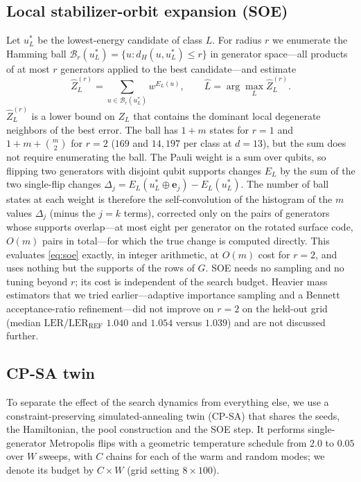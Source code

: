 \documentclass[journal]{IEEEtran}
\newcommand{\REF}{\mathrm{REF}}
\newcommand{\LER}{\mathrm{LER}}
\begin{document}
\subsection{Local stabilizer-orbit expansion (SOE)}
\label{sec:soe}
Let $u_L^\ast$ be the lowest-energy candidate of class $L$. For radius $r$ we enumerate the Hamming ball $\mathcal{B}_r(u_L^\ast)=\{u: d_H(u,u_L^\ast)\le r\}$ in generator space---all products of at most $r$ generators applied to the best candidate---and estimate
\begin{equation}
\hat Z_L^{(r)}=\sum_{u\in\mathcal{B}_r(u_L^\ast)} w^{E_L(u)},\qquad \hat L=\arg\max_L \hat Z_L^{(r)}.
\label{eq:soe}
\end{equation}
$\hat Z_L^{(r)}$ is a lower bound on $Z_L$ that contains the dominant local degenerate neighbors of the best error. The ball has $1+m$ states for $r=1$ and $1+m+\binom{m}{2}$ for $r=2$ ($169$ and $14{,}197$ per class at $d=13$), but the sum does not require enumerating the ball. The Pauli weight is a sum over qubits, so flipping two generators with disjoint qubit supports changes $E_L$ by the sum of the two single-flip changes $\Delta_j=E_L(u_L^\ast\oplus\mathbf{e}_j)-E_L(u_L^\ast)$. The number of ball states at each weight is therefore the self-convolution of the histogram of the $m$ values $\Delta_j$ (minus the $j=k$ terms), corrected only on the pairs of generators whose supports overlap---at most eight per generator on the rotated surface code, $O(m)$ pairs in total---for which the true change is computed directly. This evaluates \cref{eq:soe} exactly, in integer arithmetic, at $O(m)$ cost for $r=2$, and uses nothing but the supports of the rows of $G$. SOE needs no sampling and no tuning beyond $r$; its cost is independent of the search budget. Heavier mass estimators that we tried earlier---adaptive importance sampling and a Bennett acceptance-ratio refinement---did not improve on $r=2$ on the held-out grid (median $\LER/\LER_\REF$ $1.040$ and $1.054$ versus $1.039$) and are not discussed further.

\subsection{CP-SA twin}
To separate the effect of the search dynamics from everything else, we use a constraint-preserving simulated-annealing twin (CP-SA) that shares the seeds, the Hamiltonian, the pool construction and the SOE step. It performs single-generator Metropolis flips with a geometric temperature schedule from $2.0$ to $0.05$ over $W$ sweeps, with $C$ chains for each of the warm and random modes; we denote its budget by $C\times W$ (grid setting $8\times100$).
\end{document}
